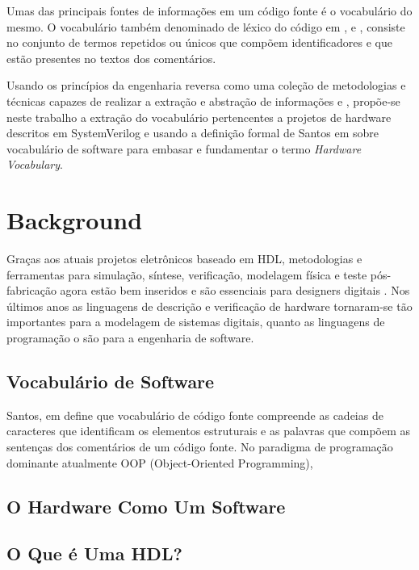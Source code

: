 \documentclass[12pt, twocolumn, a4paper]{article}
\begin{document}
Umas das principais fontes de informações em um código fonte é o vocabulário do mesmo. O vocabulário também denominado de léxico do código em \cite{Host2007}, \cite{Antoniol2007} e \cite{Santos2009}, consiste no conjunto de termos repetidos ou únicos que compõem identificadores e que estão presentes no textos dos comentários\cite{Abebe2009}.

Usando os princípios da engenharia reversa como uma coleção de metodologias e técnicas capazes de realizar a extração e abstração de informações\cite{BENEDUSI1992225} e \cite{Santos2009}, propõe-se neste trabalho a extração do vocabulário pertencentes a projetos de hardware descritos em SystemVerilog e usando a definição formal de Santos em \cite{santos2015} sobre vocabulário de software para embasar e fundamentar o termo \textit{Hardware Vocabulary}. 

	\section{Background}
\quad Graças aos atuais projetos eletrônicos baseado em HDL, metodologias e ferramentas para simulação, síntese, verificação, modelagem física e teste pós-fabricação agora estão bem inseridos e são essenciais para designers digitais \cite{Navabi2015}. Nos últimos anos as linguagens de descrição e verificação de hardware tornaram-se tão importantes para a modelagem de sistemas digitais, quanto as linguagens de programação o são para a engenharia de software. 
	
	\subsection{Vocabulário de Software}
\quad Santos, em \cite{Santos2009} define que vocabulário de código fonte compreende as cadeias de caracteres que identificam os elementos estruturais e as palavras que compõem as sentenças dos comentários de um código fonte. No paradigma de programação dominante atualmente OOP (Object-Oriented Programming),

	\subsection{O Hardware Como Um Software}
\quad 

	\subsection{O Que é Uma HDL?}
\end{document}
